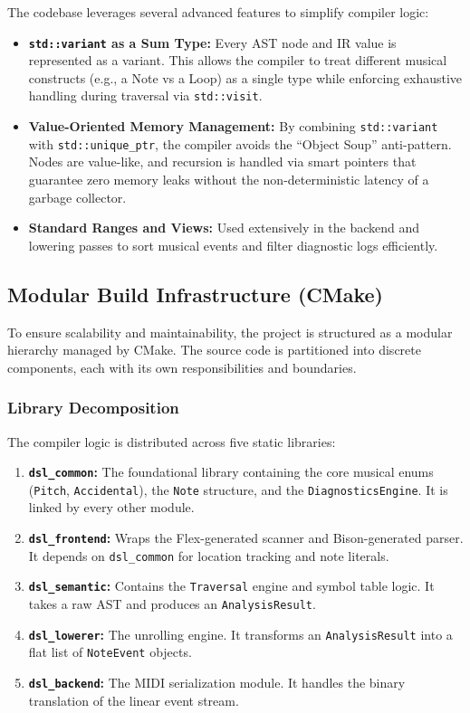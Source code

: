 The codebase leverages several advanced features to simplify compiler logic:
\begin{itemize}
  \item \textbf{\texttt{std::variant} as a Sum Type:} Every AST node and IR value is represented as a variant.
    This allows the compiler to treat different musical constructs (e.g., a Note vs a Loop) as a single type while
    enforcing exhaustive handling during traversal via \texttt{std::visit}.
  \item \textbf{Value-Oriented Memory Management:} By combining \texttt{std::variant} with
    \texttt{std::unique\_ptr}, the
    compiler avoids the ``Object Soup'' anti-pattern.
    Nodes are value-like, and recursion is handled via smart pointers that guarantee zero memory leaks without the
    non-deterministic latency of a garbage collector.
  \item \textbf{Standard Ranges and Views:} Used extensively in the backend and lowering passes to sort musical events
    and filter diagnostic logs efficiently.
\end{itemize}

\subsection{Modular Build Infrastructure (CMake)}\label{subsec:modular-build-infrastructure-(cmake)}

To ensure scalability and maintainability, the project is structured as a modular hierarchy managed by CMake.
The source code is partitioned into discrete components, each with its own responsibilities and boundaries.

\subsubsection{Library Decomposition}

The compiler logic is distributed across five static libraries:
\begin{enumerate}
  \item \textbf{\texttt{dsl\_common}:} The foundational library containing the core musical enums (\texttt{Pitch},
    \texttt{Accidental}), the \texttt{Note} structure, and the \texttt{DiagnosticsEngine}.
    It is linked by every other module.
  \item \textbf{\texttt{dsl\_frontend}:} Wraps the Flex-generated scanner and Bison-generated parser.
    It depends on \texttt{dsl\_common} for location tracking and note literals.
  \item \textbf{\texttt{dsl\_semantic}:} Contains the \texttt{Traversal} engine and symbol table logic.
    It takes a raw AST and produces an \texttt{AnalysisResult}.
  \item \textbf{\texttt{dsl\_lowerer}:} The unrolling engine.
    It transforms an \texttt{AnalysisResult} into a flat list of \texttt{NoteEvent} objects.
  \item \textbf{\texttt{dsl\_backend}:} The MIDI serialization module.
    It handles the binary translation of the linear event stream.
\end{enumerate}

